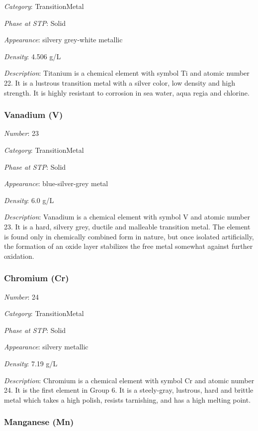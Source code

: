\documentclass{article}
\begin{document}
\textit{Category}: TransitionMetal

\textit{Phase at STP}: Solid

\textit{Appearance}: silvery grey-white metallic

\textit{Density}: 4.506 g/L

\textit{Description}: Titanium is a chemical element with symbol Ti and atomic number 22. It is a lustrous transition metal with a silver color, low density and high strength. It is highly resistant to corrosion in sea water, aqua regia and chlorine.

\hypertarget{subsubsection::V}{}\subsubsection{Vanadium (V)}

\textit{Number}: 23

\textit{Category}: TransitionMetal

\textit{Phase at STP}: Solid

\textit{Appearance}: blue-silver-grey metal

\textit{Density}: 6.0 g/L

\textit{Description}: Vanadium is a chemical element with symbol V and atomic number 23. It is a hard, silvery grey, ductile and malleable transition metal. The element is found only in chemically combined form in nature, but once isolated artificially, the formation of an oxide layer stabilizes the free metal somewhat against further oxidation.

\hypertarget{subsubsection::Cr}{}\subsubsection{Chromium (Cr)}

\textit{Number}: 24

\textit{Category}: TransitionMetal

\textit{Phase at STP}: Solid

\textit{Appearance}: silvery metallic

\textit{Density}: 7.19 g/L

\textit{Description}: Chromium is a chemical element with symbol Cr and atomic number 24. It is the first element in Group 6. It is a steely-gray, lustrous, hard and brittle metal which takes a high polish, resists tarnishing, and has a high melting point.

\hypertarget{subsubsection::Mn}{}\subsubsection{Manganese (Mn)}
\end{document}
